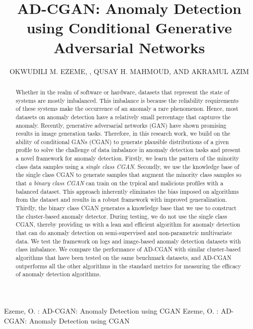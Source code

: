 \documentclass{ieeeaccess}
\begin{document}

\title{AD-CGAN: Anomaly Detection using Conditional Generative Adversarial Networks}
\author{\uppercase{Okwudili M. Ezeme}, ,
\uppercase{Qusay H. Mahmoud,  and Akramul Azim }}
\address{Department of Electrical, Computer and Software Engineering \\
	Ontario Tech University, Oshawa, ON L1G 0C5 Canada\\
	(e-mail: \{mellitus.ezeme, qusay.mahmoud, akramul.azim\}@ontariotechu.net)}

\markboth
{Ezeme, O. \headeretal: AD-CGAN: Anomaly Detection using CGAN}
{Ezeme, O. \headeretal: AD-CGAN: Anomaly Detection using CGAN}


\begin{abstract}
Whether in the realm of software or hardware, datasets that represent the state of systems are mostly imbalanced. This imbalance is because the reliability requirements of these systems make the occurrence of an anomaly a rare phenomenon. Hence, most datasets on anomaly detection have a relatively small percentage that captures the anomaly. Recently, generative adversarial networks (GAN) have shown promising results in image generation tasks. Therefore, in this research work, we build on the ability of conditional GANs (CGAN) to generate plausible distributions of a given profile to solve the challenge of data imbalance in anomaly detection tasks and present a novel framework for anomaly detection. Firstly, we learn the pattern of the minority class data samples using a \textit{single class CGAN}. Secondly, we use the knowledge base of the single class CGAN to generate samples that augment the minority class samples so that \textit{a binary class CGAN} can train on the typical and malicious profiles with a balanced dataset. This approach inherently eliminates the bias imposed on algorithms from the dataset and results in a robust framework with improved generalization. Thirdly, the binary class CGAN generates a knowledge base that we use to construct the cluster-based anomaly detector. During testing,  we do not use the single class CGAN, thereby providing us with a lean and efficient algorithm for anomaly detection that can do anomaly detection on semi-supervised and non-parametric multivariate data. 
We test the framework on logs and image-based anomaly detection datasets with class imbalance.
We compare the performance of AD-CGAN with similar cluster-based algorithms that have been tested on the same benchmark datasets, and AD-CGAN outperforms all the other algorithms in the standard metrics for measuring the efficacy of anomaly detection algorithms.
\end{abstract}
\end{document}
